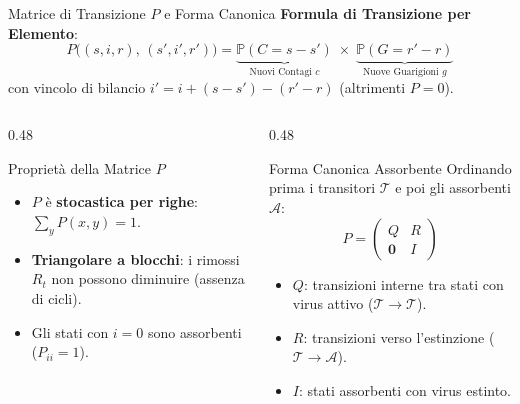 \documentclass[10pt, aspectratio=169]{beamer}
\begin{document}
\begin{frame}{Matrice di Transizione $P$ e Forma Canonica}
    \textbf{Formula di Transizione per Elemento}:
    \[
    P\bigl((s,i,r),\, (s',i',r')\bigr) = \underbrace{\mathbb{P}(C = s - s')}_{\text{Nuovi Contagi } c} \;\times\; \underbrace{\mathbb{P}(G = r' - r)}_{\text{Nuove Guarigioni } g}
    \]
    \footnotesize con vincolo di bilancio $i' = i + (s - s') - (r' - r)$ (altrimenti $P = 0$).
    \normalsize

    \vspace{0.15cm}
    \begin{columns}[T]
        \begin{column}{0.48\textwidth}
            \begin{block}{Proprietà della Matrice $P$}
                \begin{itemize}
                    \item $P$ è \textbf{stocastica per righe}: $\sum_y P(x,y) = 1$.
                    \item \textbf{Triangolare a blocchi}: i rimossi $R_t$ non possono diminuire (assenza di cicli).
                    \item Gli stati con $i=0$ sono assorbenti ($P_{ii}=1$).
                \end{itemize}
            \end{block}
        \end{column}
        \begin{column}{0.48\textwidth}
            \begin{block}{Forma Canonica Assorbente}
                Ordinando prima i transitori $\mathcal{T}$ e poi gli assorbenti $\mathcal{A}$:
                \[ P = \begin{pmatrix} Q & R \\ \mathbf{0} & I \end{pmatrix} \]
                \begin{itemize}
                    \item $Q$: transizioni interne tra stati con virus attivo ($\mathcal{T} \to \mathcal{T}$).
                    \item $R$: transizioni verso l'estinzione ($\mathcal{T} \to \mathcal{A}$).
                    \item $I$: stati assorbenti con virus estinto.
                \end{itemize}
            \end{block}
        \end{column}
    \end{columns}

\end{frame}
\end{document}
